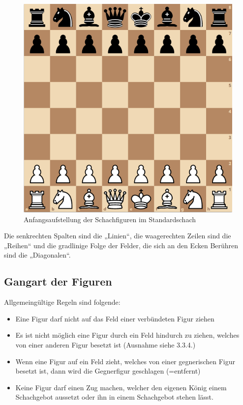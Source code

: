 \documentclass[a4paper, 10pt]{scrartcl}
\begin{document}
\begin{figure}
        \centering
        \includegraphics[scale=0.5]{assets/chess-opening.png}
        \caption{Anfangsaufstellung der Schachfiguren im Standardschach}
\end{figure}


Die senkrechten Spalten sind die „Linien“, die waagerechten Zeilen sind die „Reihen“ und die gradlinige Folge der Felder, die sich an den Ecken Berühren sind die „Diagonalen“.

\subsection{Gangart der Figuren}
Allgemeingültige Regeln sind folgende:
\begin{itemize}
        \item Eine Figur darf nicht auf das Feld einer verbündeten Figur ziehen
        \item Es ist nicht möglich eine Figur durch ein Feld hindurch zu ziehen, welches von einer anderen Figur besetzt ist (Ausnahme siehe 3.3.4.)
        \item Wenn eine Figur auf ein Feld zieht, welches von einer gegnerischen Figur besetzt ist, dann wird die Gegnerfigur geschlagen (=entfernt)
        \item Keine Figur darf einen Zug machen, welcher den eigenen König einem Schachgebot aussetzt oder ihn in einem Schachgebot stehen lässt.
    
\end{itemize}
\end{document}
